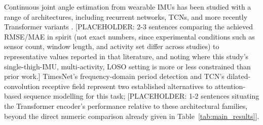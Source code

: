 Continuous joint angle estimation from wearable IMUs has been studied with a
range of architectures, including recurrent networks, TCNs, and more recently
Transformer variants \cite{PLACEHOLDER}. %
[PLACEHOLDER: 2-3 sentences comparing the achieved RMSE/MAE in spirit
(not exact numbers, since experimental conditions such as sensor count, window
length, and activity set differ across studies) to representative values
reported in that literature, and noting where this study's single-thigh-IMU,
multi-activity, LOSO setting is more or less constrained than prior work.]
TimesNet's frequency-domain period detection \cite{PLACEHOLDER} and TCN's
dilated-convolution receptive field \cite{PLACEHOLDER} represent two established
alternatives to attention-based sequence modelling for this task; [PLACEHOLDER:
1-2 sentences situating the Transformer encoder's performance relative to these
architectural families, beyond the direct numeric comparison already given in
Table~\ref{tab:main_results}].